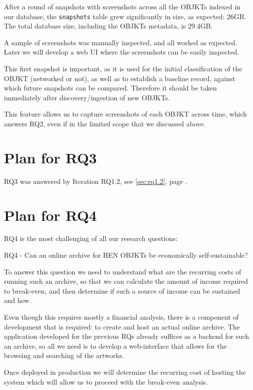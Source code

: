 After a round of snapshots with screenshots across all the OBJKTs indexed in our database, the \texttt{snapshots} table grew significantly in size, as expected: 26GB. The total database size, including the OBJKTs metadata, is 29.4GB.

A sample of screenshots was manually inspected, and all worked as expected. Later we will develop a web UI where the screenshots can be easily inspected.

This first snapshot is important, as it is used for the initial classification of the OBJKT (networked or not), as well as to establish a baseline record, against which future snapshots can be compared. Therefore it should be taken immediately after discovery/ingestion of new OBJKTs.

This feature allows us to capture screenshots of each OBJKT across time, which answers RQ2, even if in the limited scope that we discussed above.

\section{Plan for RQ3}

RQ3 was answered by Iteration RQ1.2, see \autoref{sec:rq1.2}, page \pageref{txt:rq3-answered}.

\section{Plan for RQ4}

RQ4 is the most challenging of all our research questions:

\vspace{0.5cm}
RQ4 - Can an online archive for HEN OBJKTs be economically self-sustainable?
\vspace{0.5cm}

To answer this question we need to understand what are the recurring costs of running such an archive, so that we can calculate the amount of income required to break-even, and then determine if such a source of income can be sustained and how.

Even though this requires mostly a financial analysis, there is a component of development that is required: to create and host an actual online archive.
The application developed for the previous RQs already suffices as a backend for such an archive, so all we need is to develop a web-interface that allows for the browsing and searching of the artworks.

Once deployed in production we will determine the recurring cost of hosting the system which will allow us to proceed with the break-even analysis.

